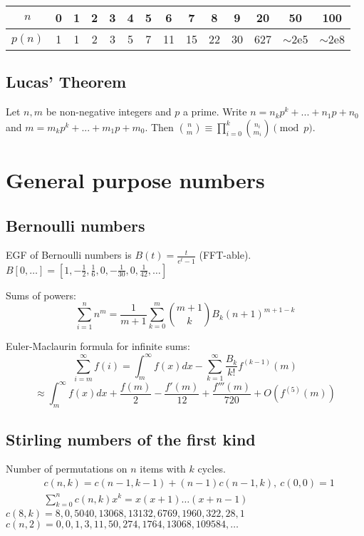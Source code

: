 		\begin{center}
		\begin{tabular}{c|c@{\ }c@{\ }c@{\ }c@{\ }c@{\ }c@{\ }c@{\ }c@{\ }c@{\ }c@{\ }c@{\ }c@{\ }c}
			$n$    & 0 & 1 & 2 & 3 & 4 & 5 & 6  & 7  & 8  & 9  & 20  & 50  & 100 \\ \hline
			$p(n)$ & 1 & 1 & 2 & 3 & 5 & 7 & 11 & 15 & 22 & 30 & 627 & $\mathtt{\sim}$2e5 & $\mathtt{\sim}$2e8 \\
		\end{tabular}
		\end{center}

	\subsection{Lucas' Theorem}
		Let $n,m$ be non-negative integers and $p$ a prime. Write $n=n_kp^k+...+n_1p+n_0$ and $m=m_kp^k+...+m_1p+m_0$. Then $\binom{n}{m} \equiv \prod_{i=0}^k\binom{n_i}{m_i} \pmod{p}$.

\section{General purpose numbers}
	\subsection{Bernoulli numbers}
		EGF of Bernoulli numbers is $B(t)=\frac{t}{e^t-1}$ (FFT-able).
		$B[0,\ldots] = [1, -\frac{1}{2}, \frac{1}{6}, 0, -\frac{1}{30}, 0, \frac{1}{42}, \ldots]$

		Sums of powers:
		\small
		\[ \sum_{i=1}^n n^m = \frac{1}{m+1} \sum_{k=0}^m \binom{m+1}{k} B_k (n+1)^{m+1-k} \]
		\normalsize

		Euler-Maclaurin formula for infinite sums:
		\small
		\[ \sum_{i=m}^{\infty} f(i) = \int_m^\infty f(x) dx - \sum_{k=1}^\infty \frac{B_k}{k!}f^{(k-1)}(m) \]
		\[ \approx \int_{m}^\infty f(x)dx + \frac{f(m)}{2} - \frac{f'(m)}{12} + \frac{f'''(m)}{720} + O(f^{(5)}(m)) \]
		\normalsize

	\subsection{Stirling numbers of the first kind}
		Number of permutations on $n$ items with $k$ cycles.
		\begin{align*}
			&c(n,k) = c(n-1,k-1) + (n-1) c(n-1,k),\ c(0,0) = 1 \\
			&\textstyle \sum_{k=0}^n c(n,k)x^k = x(x+1) \dots (x+n-1)
		\end{align*}
		$c(8,k) = 8, 0, 5040, 13068, 13132, 6769, 1960, 322, 28, 1$ \\
		$c(n,2) = 0, 0, 1, 3, 11, 50, 274, 1764, 13068, 109584, \dots$

